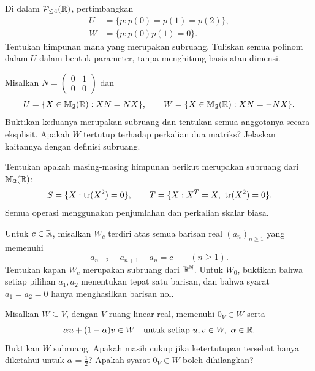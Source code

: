 \begin{latihan}\label{linear:lat-polinom}
    Di dalam $\mathcal P_{\le4}(\mathbb{R})$, pertimbangkan
    \begin{align*}
        U & =\{p:p(0)=p(1)=p(2)\}, \\
        W & =\{p:p(0)p(1)=0\}.
    \end{align*}
    Tentukan himpunan mana yang merupakan subruang.
    Tuliskan semua polinom dalam $U$ dalam bentuk parameter,
    tanpa menghitung basis atau dimensi.
\end{latihan}

\begin{latihan}\label{linear:lat-komutatif}
    Misalkan $N=\begin{pmatrix}0&1\\0&0\end{pmatrix}$ dan
    \[
        U=\{X\in\mathbb{M}_2(\mathbb{R}):XN=NX\},\qquad
        W=\{X\in\mathbb{M}_2(\mathbb{R}):XN=-NX\}.
    \]
    Buktikan keduanya merupakan subruang dan tentukan semua
    anggotanya secara eksplisit. Apakah $W$ tertutup terhadap
    perkalian dua matriks? Jelaskan kaitannya dengan definisi subruang.
\end{latihan}

\begin{latihan}\label{linear:lat-trace-kuadrat}
    Tentukan apakah masing-masing himpunan berikut merupakan
    subruang dari $\mathbb{M}_2(\mathbb{R})$:
    \[
        S=\{X:\operatorname{tr}(X^2)=0\},\qquad
        T=\{X:X^T=X,\ \operatorname{tr}(X^2)=0\}.
    \]
    Semua operasi menggunakan penjumlahan dan perkalian skalar biasa.
\end{latihan}

\begin{latihan}\label{linear:lat-rekurensi}
    Untuk $c\in\mathbb{R}$, misalkan $W_c$ terdiri atas semua barisan real
    $(a_n)_{n\ge1}$ yang memenuhi
    \[
        a_{n+2}-a_{n+1}-a_n=c\qquad(n\ge1).
    \]
    Tentukan kapan $W_c$ merupakan subruang dari $\mathbb{R}^{\mathbb N}$.
    Untuk $W_0$, buktikan bahwa setiap pilihan $a_1,a_2$ menentukan
    tepat satu barisan, dan bahwa syarat $a_1=a_2=0$ hanya
    menghasilkan barisan nol.
\end{latihan}

\begin{latihan}\label{linear:lat-afine}
    Misalkan $W\subseteq V$, dengan $V$ ruang linear real,
    memenuhi $0_V\in W$ serta
    \[
        \alpha u+(1-\alpha)v\in W
        \quad\text{untuk setiap }u,v\in W,\ \alpha\in\mathbb{R}.
    \]
    Buktikan $W$ subruang.
    Apakah masih cukup jika ketertutupan tersebut hanya diketahui
    untuk $\alpha=\tfrac12$? Apakah syarat $0_V\in W$ boleh dihilangkan?
\end{latihan}

